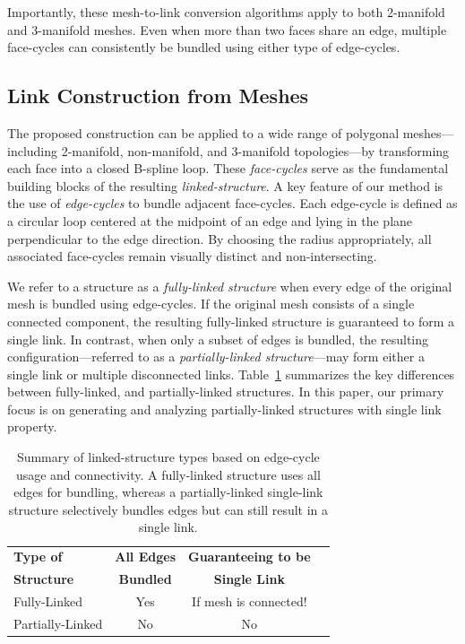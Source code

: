 \documentclass[times,twocolumn,final]{elsarticle}
\begin{document}
Importantly, these mesh-to-link conversion algorithms apply to both 2-manifold and 3-manifold meshes. Even when more than two faces share an edge, multiple face-cycles can consistently be bundled using either type of edge-cycles.


\subsection{Link Construction from Meshes}

The proposed construction can be applied to a wide range of polygonal meshes—including 2-manifold, non-manifold, and 3-manifold topologies—by transforming each face into a closed B-spline loop. These \textit{face-cycles} serve as the fundamental building blocks of the resulting \textit{linked-structure}. A key feature of our method is the use of \textit{edge-cycles} to bundle adjacent face-cycles. Each edge-cycle is defined as a circular loop centered at the midpoint of an edge and lying in the plane perpendicular to the edge direction. By choosing the radius appropriately, all associated face-cycles remain visually distinct and non-intersecting.

We refer to a structure as a \textit{fully-linked structure} when every edge of the original mesh is bundled using edge-cycles. If the original mesh consists of a single connected component, the resulting fully-linked structure is guaranteed to form a single link. In contrast, when only a subset of edges is bundled, the resulting configuration—referred to as a \textit{partially-linked structure}—may form either a single link or multiple disconnected links. Table~\ref{tab:link_types} summarizes the key differences between fully-linked, and partially-linked structures. In this paper, our primary focus is on generating and analyzing partially-linked structures with single link property.

\begin{table}[h]
\centering
\caption{Summary of linked-structure types based on edge-cycle usage and connectivity. A fully-linked structure uses all edges for bundling, whereas a partially-linked single-link structure selectively bundles edges but can still result in a single link.}
\begin{tabular}{|l|c|c|c|}
\hline
\textbf{Type of} & \textbf{All Edges} & \textbf{Guaranteeing to be}  \\
\textbf{Structure} & \textbf{Bundled} & \textbf{Single Link}  \\
\hline
Fully-Linked & Yes & If mesh is connected!  \\
\hline
Partially-Linked & No  & No \\
\hline
\end{tabular}
\label{tab:link_types}
\end{table}
\end{document}
